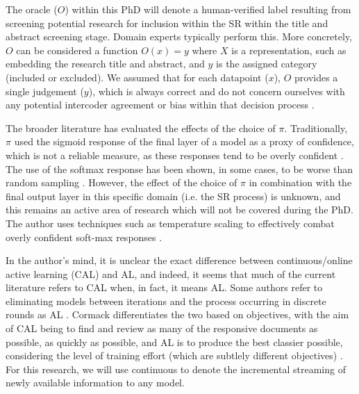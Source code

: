 \documentclass[10pt, english]{article}
\begin{document}
The oracle ($O$) within this PhD will denote a human-verified label resulting from screening potential research for inclusion within the SR within the title and abstract screening stage. Domain experts typically perform this. More concretely, $O$ can be considered a function $O(x) = y$ where $X$ is a representation, such as embedding the research title and abstract, and $y$ is the assigned category (included or excluded). We assumed that for each datapoint ($x$), $O$ provides a single judgement ($y$), which is always correct and do not concern ourselves with any potential intercoder agreement or bias within that decision process \cite{artstein_survey_2008}.

The broader literature has evaluated the effects of the choice of $\pi$. Traditionally, $\pi$ used the sigmoid response of the final layer of a model as a proxy of confidence, which is not a reliable measure, as these responses tend to be overly confident \cite{pearce_understanding_2021}. The use of the softmax response has been shown, in some cases, to be worse than random sampling \cite{wang_new_2014}. However, the effect of the choice of $\pi$ in combination with the final output layer in this specific domain (i.e. the SR process) is unknown, and this remains an active area of research which will not be covered during the PhD. The author uses techniques such as temperature scaling to effectively combat overly confident soft-max responses \cite{guo_calibration_2017}.



In the author's mind, it is unclear the exact difference between continuous/online active learning (CAL) and AL, and indeed, it seems that much of the current literature refers to CAL when, in fact, it means AL. Some authors refer to eliminating models between iterations and the process occurring in discrete rounds as AL \cite{settles_active_2009}. Cormack differentiates the two based on objectives, with the aim of CAL being to find and review as many of the responsive documents as possible, as quickly as possible, and AL is to produce the best classier possible, considering the level of training effort (which are subtlely different objectives) \cite{cormack_autonomy_2015}. For this research, we will use continuous to denote the incremental streaming of newly available information to any model. 
\end{document}
